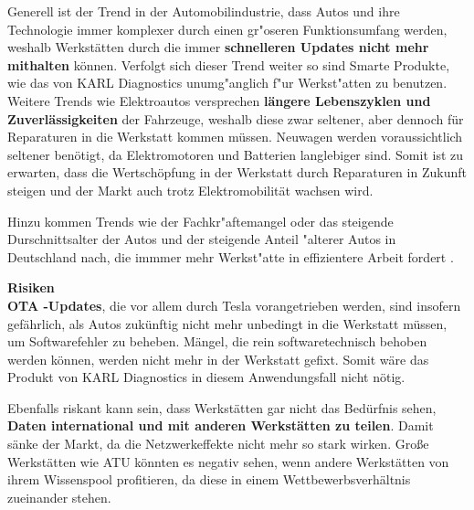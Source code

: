 Generell ist der Trend in der Automobilindustrie, dass Autos und ihre Technologie immer komplexer durch einen gr"oseren Funktionsumfang werden, weshalb Werkst\"atten durch die immer \textbf{schnelleren Updates nicht mehr mithalten} k\"onnen. Verfolgt sich dieser Trend weiter so sind Smarte Produkte, wie das von KARL Diagnostics unumg"anglich f"ur Werkst"atten zu benutzen. \\

Weitere Trends wie Elektroautos versprechen \textbf{l\"angere Lebenszyklen und Zuverl\"assigkeiten} der Fahrzeuge, weshalb diese zwar seltener, aber dennoch f\"ur Reparaturen in die Werkstatt kommen m\"ussen. Neuwagen werden voraussichtlich seltener ben\"otigt, da Elektromotoren und Batterien langlebiger sind. Somit ist zu erwarten, dass die Wertsch\"opfung in der Werkstatt durch Reparaturen in Zukunft steigen und der Markt auch trotz Elektromobilit\"at wachsen wird.

Hinzu kommen Trends wie der Fachkr"aftemangel oder das steigende Durschnittsalter der Autos und der steigende Anteil "alterer Autos in Deutschland nach, die immmer mehr Werkst"atte in effizientere Arbeit fordert \citep[][]{Statista-Auto-Alter}.

\textbf{Risiken} \\
\textbf{\acl{OTA} -Updates}, die vor allem durch Tesla vorangetrieben werden, sind insofern gef\"ahrlich, als Autos zuk\"unftig nicht mehr unbedingt in die Werkstatt m\"ussen, um Softwarefehler zu beheben. M\"angel, die rein softwaretechnisch behoben werden k\"onnen, werden nicht mehr in der Werkstatt gefixt. Somit w\"are das Produkt von KARL Diagnostics in diesem Anwendungsfall nicht n\"otig.

Ebenfalls riskant kann sein, dass Werkst\"atten gar nicht das Bed\"urfnis sehen, \textbf{Daten international und mit anderen Werkst\"atten zu teilen}. Damit s\"anke der Markt, da die Netzwerkeffekte nicht mehr so stark wirken. Gro\ss e Werkst\"atten wie ATU k\"onnten es negativ sehen, wenn andere Werkst\"atten von ihrem Wissenspool profitieren, da diese in einem Wettbewerbsverh\"altnis zueinander stehen.




